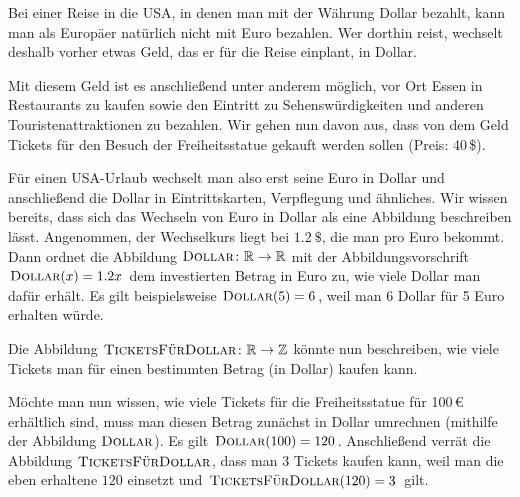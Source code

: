 \documentclass[../../main.tex]{subfiles}
\begin{document}
\begin{example}
    Bei einer Reise in die USA, in denen man mit der Währung Dollar bezahlt, kann man als Europäer natürlich nicht mit Euro bezahlen. Wer dorthin reist, wechselt deshalb vorher etwas Geld, das er für die Reise einplant, in Dollar.
    
    Mit diesem Geld ist es anschließend unter anderem möglich, vor Ort Essen in Restaurants zu kaufen sowie den Eintritt zu Sehenswürdigkeiten und anderen Touristenattraktionen zu bezahlen. Wir gehen nun davon aus, dass von dem Geld Tickets für den Besuch der Freiheitsstatue gekauft werden sollen (Preis: 40\,\$).
    
    Für einen USA-Urlaub wechselt man also erst seine Euro in Dollar und anschließend die Dollar in Eintrittskarten, Verpflegung und ähnliches. Wir wissen bereits, dass sich das Wechseln von Euro in Dollar als eine Abbildung beschreiben lässt. Angenommen, der Wechselkurs liegt bei $1.2\:\$$, die man pro Euro bekommt. Dann ordnet die Abbildung $\textsc{Dollar}\colon\mathbb{R}\rightarrow\mathbb{R}$ mit der Abbildungsvorschrift $\textsc{Dollar}(x)=1.2x$ dem investierten Betrag in Euro zu, wie viele Dollar man dafür erhält. Es gilt beispielsweise $\textsc{Dollar}(5)=6$, weil man 6 Dollar für 5 Euro erhalten würde.
    
    Die Abbildung $\textsc{TicketsFürDollar}\colon\mathbb{R}\rightarrow\mathbb{Z}$ könnte nun beschreiben, wie viele Tickets man für einen bestimmten Betrag (in Dollar) kaufen kann.
    
    Möchte man nun wissen, wie viele Tickets für die Freiheitsstatue für 100\,€ erhältlich sind, muss man diesen Betrag zunächst in Dollar umrechnen (mithilfe der Abbildung $\textsc{Dollar}$). Es gilt $\textsc{Dollar}(100)=120$. Anschließend verrät die Abbildung $\textsc{TicketsFürDollar}$, dass man $3$ Tickets kaufen kann, weil man die eben erhaltene $120$ einsetzt und $\textsc{TicketsFürDollar}(120)=3$ gilt.
    

\end{example}
\end{document}
